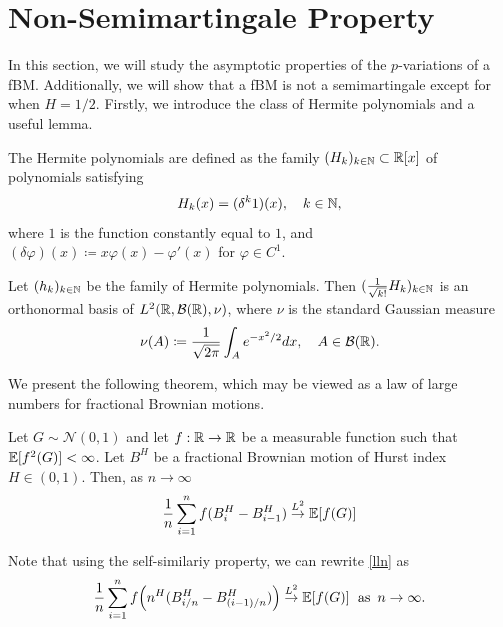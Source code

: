 \section{Non-Semimartingale Property}
In this section, we will study the asymptotic properties of the $p$-variations of a fBM. Additionally, we will show that a fBM is not a semimartingale except for when $H=1/2$. Firstly, we introduce the class of Hermite polynomials and a useful lemma.
\begin{defn}
    The Hermite polynomials are defined as the family $(H_{k})_{k\in \mathbb{N}}\subset \mathbb{R}[x]$ of polynomials satisfying
    \begin{equation}
        H_{k}(x)=(\delta^{k}1)(x), \quad k\in\mathbb{N},
    \end{equation}
    where $1$ is the function constantly equal to $1$, and $(\delta\varphi)(x)\coloneqq x\varphi(x)-\varphi'(x)$ for $\varphi\in C^{1}$.
\end{defn}
\begin{lem}\label{l2lemma}
    Let $(h_{k})_{k\in \mathbb{N}}$ be the family of Hermite polynomials. Then $(\frac{1}{\sqrt{k!}}H_{k})_{k\in\mathbb{N}}$ is an orthonormal basis of $L^{2}\left(\R,\mathcal{B}(\R),\nu\right)$, where $\nu$ is the standard Gaussian measure
    \begin{equation}
        \nu(A)\coloneqq \frac{1}{\sqrt{2\pi}}\int_{A}e^{-x^{2}/2}dx,\quad A\in\mathcal{B}(\mathbb{R}).
    \end{equation}
\end{lem}
We present the following theorem, which may be viewed as a law of large numbers for fractional Brownian motions.
\begin{thm}\label{llnthm}
    Let $G\sim\mathcal{N}(0,1)$ and let $f:\mathbb{R}\to\mathbb{R}$ be a measurable function such that $\mathbb{E}[f^{2}(G)]<\infty$. Let $B^H$ be a fractional Brownian motion of Hurst index $H\in (0,1)$. Then, as $n\to\infty$
    \begin{equation}\label{lln}
        \frac{1}{n}\sum_{i=1}^{n}f(B^{H}_{i}-B^{H}_{i-1})\overset{L^{2}}{\to} \mathbb{E}[f(G)]
    \end{equation}
\end{thm}
Note that using the self-similariy property, we can rewrite \eqref{lln} as
\begin{equation}
     \frac{1}{n}\sum_{i=1}^{n}f\left(n^{H}(B^{H}_{i/n}-B^{H}_{(i-1)/n})\right)\overset{L^{2}}{\to} \E[f(G)] \hspace{6 pt}\mathrm{as}\hspace{5 pt}n\to\infty.
\end{equation}
